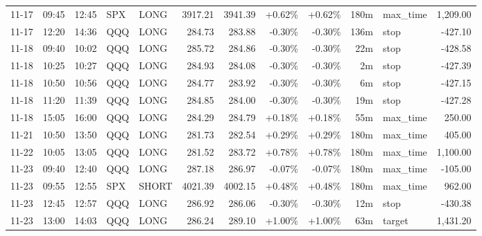 \documentclass[11pt,a4paper,twoside]{article}
\begin{document}
\begin{center}
\begin{longtable}{>{\color{txtmain}}l l l l l r r r r r >{\color{txtmain}}l r}
11-17 & 09:45 & 12:45 & SPX & LONG & 3917.21 & 3941.39 & \textcolor{wingreen}{+0.62\%} & \textcolor{wingreen}{+0.62\%} & 180m & max\_time & \textcolor{wingreen}{1,209.00} \\
11-17 & 12:20 & 14:36 & QQQ & LONG & 284.73 & 283.88 & \textcolor{lossred}{-0.30\%} & \textcolor{lossred}{-0.30\%} & 136m & stop & \textcolor{lossred}{-427.10} \\
11-18 & 09:40 & 10:02 & QQQ & LONG & 285.72 & 284.86 & \textcolor{lossred}{-0.30\%} & \textcolor{lossred}{-0.30\%} & 22m & stop & \textcolor{lossred}{-428.58} \\
11-18 & 10:25 & 10:27 & QQQ & LONG & 284.93 & 284.08 & \textcolor{lossred}{-0.30\%} & \textcolor{lossred}{-0.30\%} & 2m & stop & \textcolor{lossred}{-427.39} \\
11-18 & 10:50 & 10:56 & QQQ & LONG & 284.77 & 283.92 & \textcolor{lossred}{-0.30\%} & \textcolor{lossred}{-0.30\%} & 6m & stop & \textcolor{lossred}{-427.15} \\
11-18 & 11:20 & 11:39 & QQQ & LONG & 284.85 & 284.00 & \textcolor{lossred}{-0.30\%} & \textcolor{lossred}{-0.30\%} & 19m & stop & \textcolor{lossred}{-427.28} \\
11-18 & 15:05 & 16:00 & QQQ & LONG & 284.29 & 284.79 & \textcolor{wingreen}{+0.18\%} & \textcolor{wingreen}{+0.18\%} & 55m & max\_time & \textcolor{wingreen}{250.00} \\
11-21 & 10:50 & 13:50 & QQQ & LONG & 281.73 & 282.54 & \textcolor{wingreen}{+0.29\%} & \textcolor{wingreen}{+0.29\%} & 180m & max\_time & \textcolor{wingreen}{405.00} \\
11-22 & 10:05 & 13:05 & QQQ & LONG & 281.52 & 283.72 & \textcolor{wingreen}{+0.78\%} & \textcolor{wingreen}{+0.78\%} & 180m & max\_time & \textcolor{wingreen}{1,100.00} \\
11-23 & 09:40 & 12:40 & QQQ & LONG & 287.18 & 286.97 & \textcolor{lossred}{-0.07\%} & \textcolor{lossred}{-0.07\%} & 180m & max\_time & \textcolor{lossred}{-105.00} \\
11-23 & 09:55 & 12:55 & SPX & SHORT & 4021.39 & 4002.15 & \textcolor{wingreen}{+0.48\%} & \textcolor{wingreen}{+0.48\%} & 180m & max\_time & \textcolor{wingreen}{962.00} \\
11-23 & 12:45 & 12:57 & QQQ & LONG & 286.92 & 286.06 & \textcolor{lossred}{-0.30\%} & \textcolor{lossred}{-0.30\%} & 12m & stop & \textcolor{lossred}{-430.38} \\
11-23 & 13:00 & 14:03 & QQQ & LONG & 286.24 & 289.10 & \textcolor{wingreen}{+1.00\%} & \textcolor{wingreen}{+1.00\%} & 63m & target & \textcolor{wingreen}{1,431.20} \\

\end{longtable}
\end{center}
\end{document}
